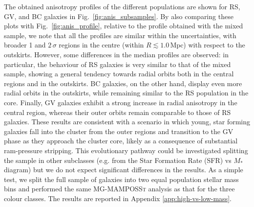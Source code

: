 \documentclass{aa}
\begin{document}
The obtained anisotropy profiles of the different populations are shown for RS, GV, and BC galaxies in Fig.~\ref{fig:anis_subsamples}. By also comparing these plots with Fig.~\ref{fig:anis_profile}, relative to the profile obtained with the mixed sample, we note that all the profiles are similar within the uncertainties, with broader 1 and $2\,\sigma$ regions in the centre (within $R \lesssim 1.0 \, \mathrm{Mpc}$) with respect to the outskirts. However, some differences in the median profiles are observed: in particular, the behaviour of RS galaxies is very similar to that of the mixed sample, showing a general tendency towards radial orbits both in the central regions and in the outskirts. BC galaxies, on the other hand, display even more radial orbits in the outskirts, while remaining similar to the RS population in the core. Finally, GV galaxies exhibit a strong increase in radial anisotropy in the central region, whereas their outer orbits remain comparable to those of RS galaxies. These results are consistent with a scenario in which young, star forming galaxies fall into the cluster from the outer regions and transition to the GV phase as they approach the cluster core, likely as a consequence of substantial ram-pressure stripping. This evolutionary pathway could be investigated splitting the sample in other subclasses (e.g. from the Star Formation Rate (SFR) vs $M_*$ diagram) but we do not expect significant differences in the results. As a simple test, we split the full sample of galaxies into two equal population stellar mass bins and performed the same \textsc{MG-MAMPOSSt} analysis as that for the three colour classes. The results are reported in Appendix \ref{app:high-vs-low-mass}. 



\end{document}

